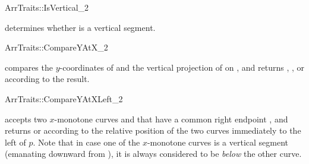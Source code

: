 \ccRefPageBegin
\begin{ccRefConcept}{ArrTraits::IsVertical_2}

\ccHasModels{}

  {determines whether  is a vertical segment.}
\end{ccRefConcept}
\ccRefPageEnd

\ccRefPageBegin
\begin{ccRefConcept}{ArrTraits::CompareYAtX_2}

\ccHasModels{}

  {compares the $y$-coordinates of  and the vertical 
  projection of  on , and returns , ,
  or  according to the result.}
\end{ccRefConcept}
\ccRefPageEnd

\ccRefPageBegin
\begin{ccRefConcept}{ArrTraits::CompareYAtXLeft_2}

\ccHasModels{}

  {accepts two $x$-monotone curves  and 
  that have a common right endpoint , and returns  or  according to the relative position of the two
  curves immediately to the left of $p$. Note that in case one of the
  $x$-monotone curves is a vertical segment (emanating downward from
  ), it is always considered to be {\sl below} the other curve.}
\end{ccRefConcept}
\ccRefPageEnd

